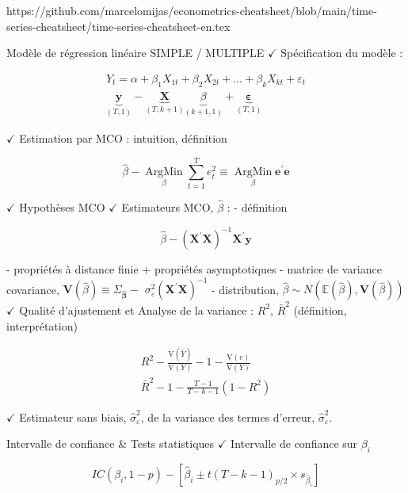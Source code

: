 

https://github.com/marcelomijas/econometrics-cheatsheet/blob/main/time-series-cheatsheet/time-series-cheatsheet-en.tex

Modèle de régression linéaire SIMPLE / MULTIPLE
$\checkmark$ Spécification du modèle :

$$
\begin{gathered}
	Y_t=\alpha+\beta_1 X_{1 t}+\beta_2 X_{2 t}+\ldots+\beta_k X_{k t}+\varepsilon_t \\
	\underbrace{\mathbf{y}}_{(T, 1)}-\underbrace{\mathbf{X}}_{(T, k+1)} \underbrace{\beta}_{(k+1,1)}+\underbrace{\boldsymbol{\varepsilon}}_{(T, 1)}
\end{gathered}
$$

$\checkmark$ Estimation par MCO : intuition, définition

$$
\hat{\beta}-\underset{\beta}{\operatorname{ArgMin}} \sum_{t=1}^T e_t^2 \equiv \underset{\beta}{\operatorname{ArgMin}} \mathbf{e}^{\prime} \mathbf{e}
$$

$\checkmark$ Hypothèses MCO
$\checkmark$ Estimateurs MCO, $\hat{\beta}$ :
- définition

$$
\hat{\beta}-\left(\mathbf{X}^{\prime} \mathbf{X}\right)^{-1} \mathbf{X}^{\prime} \mathbf{y}
$$

- propriétés à distance finie + propriétés asymptotiques
- matrice de variance covariance, $\mathbf{V}(\hat{\beta}) \equiv \Sigma_{\hat{\boldsymbol{\beta}}}-$ $\sigma_{\varepsilon}^2\left(\mathbf{X}^{\prime} \mathbf{X}\right)^{-1}$
- distribution, $\hat{\beta} \sim N(\mathbb{E}(\hat{\beta}), \mathbf{V}(\hat{\beta}))$
$\checkmark$ Qualité d'ajustement et Analyse de la variance : $R^2$, $\bar{R}^2$ (définition, interprétation)

$$
\begin{gathered}
	R^2-\frac{\mathrm{V}(\hat{Y})}{\mathrm{V}(Y)}-1-\frac{\mathrm{V}(e)}{\mathrm{V}(Y)} \\
	\bar{R}^2-1-\frac{T-1}{T-k-1}\left(1-R^2\right)
\end{gathered}
$$

$\checkmark$ Estimateur sans biais, $\hat{\sigma}_{\varepsilon}^2$, de la variance des termes d'erreur, $\hat{\sigma}_{\varepsilon}^2$.

Intervalle de confiance \& Tests statistiques
$\checkmark$ Intervalle de confiance sur $\beta_i$

$$
I C\left(\beta_i, 1-p\right)-\left[\hat{\beta}_i \pm t(T-k-1)_{p / 2} \times s_{\hat{\beta}_i}\right]
$$

